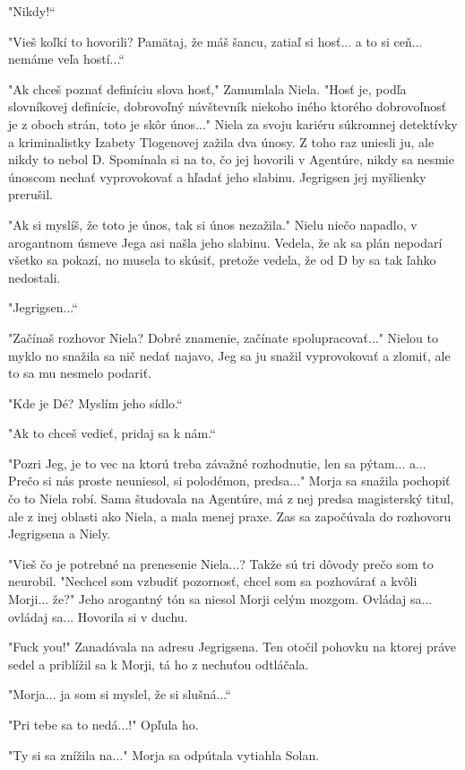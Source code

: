 \documentclass{book}
\begin{document}
"Nikdy!“

"Vieš koľkí to hovorili? Pamätaj, že máš šancu, zatiaľ si hosť... a to si ceň... nemáme veľa hostí...“

"$ $Ak chceš poznať definíciu slova hosť,"$ $ Zamumlala Niela. "Hosť je, podľa slovníkovej definície, dobrovoľný návštevník niekoho iného ktorého dobrovoľnosť je z oboch strán, toto je skôr únos..."$ $ Niela za svoju kariéru súkromnej detektívky a kriminalistky Izabety Tlogenovej zažila dva únosy. Z toho raz uniesli ju, ale nikdy to nebol D. Spomínala si na to, čo jej hovorili v Agentúre, nikdy sa nesmie únoscom nechať vyprovokovať a hľadať jeho slabinu. Jegrigsen jej myšlienky prerušil.

"$ $Ak si myslíš, že toto je únos, tak si únos nezažila."$ $ Nielu niečo napadlo, v arogantnom úsmeve Jega asi našla jeho slabinu. Vedela, že ak sa plán nepodarí všetko sa pokazí, no musela to skúsiť, pretože vedela, že od D by sa tak ľahko nedostali.

"Jegrigsen...“

"Začínaš rozhovor Niela? Dobré znamenie, začínate spolupracovať..."$ $ Nielou to myklo no snažila sa nič nedať najavo, Jeg sa ju snažil vyprovokovať a zlomiť, ale to sa mu nesmelo podariť.

"Kde je Dé? Myslím jeho sídlo.“

"$ $Ak to chceš vedieť, pridaj sa k nám.“

"Pozri Jeg, je to vec na ktorú treba závažné rozhodnutie, len sa pýtam... a... Prečo si nás proste neuniesol, si polodémon, predsa..."$ $ Morja sa snažila pochopiť čo to Niela robí. Sama študovala na Agentúre, má z nej predsa magisterský titul, ale z inej oblasti ako Niela, a mala menej praxe. Zas sa započúvala do rozhovoru Jegrigsena a Niely.

"Vieš čo je potrebné na prenesenie Niela...? Takže sú tri dôvody prečo som to neurobil. "Nechcel som vzbudiť pozornosť, chcel som sa pozhovárať a kvôli Morji... že?"$ $ Jeho arogantný tón sa niesol Morji celým mozgom. Ovládaj sa... ovládaj sa... Hovorila si v duchu.

"Fuck you!"$ $ Zanadávala na adresu Jegrigsena. Ten otočil pohovku na ktorej práve sedel a priblížil sa k Morji, tá ho z nechuťou odtláčala.

"Morja... ja som si myslel, že si slušná...“

"Pri tebe sa to nedá...!"$ $ Opľula ho.

"Ty si sa znížila na..."$ $ Morja sa odpútala vytiahla Solan. 
\end{document}
